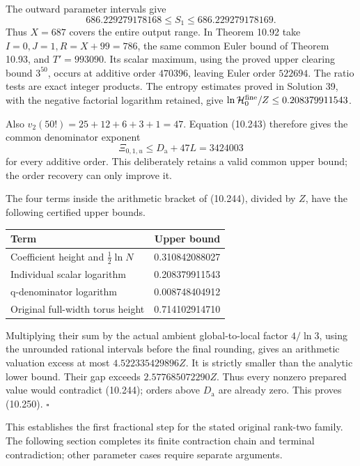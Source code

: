 \documentclass[
  11pt,
  a4paper,
]{article}
\newcounter{none} %
\begin{document}
The outward parameter intervals give \[
686.229279178168\le S_1\le686.229279178169.
\] Thus \(X=687\) covers the entire output range. In Theorem 10.92 take
\(I=0,J=1,R=X+99=786\), the same common Euler bound of Theorem 10.93,
and \(T'=993090\). Its scalar maximum, using the proved upper clearing
bound \(3^{50}\), occurs at additive order \(470396\), leaving Euler
order \(522694\). The ratio tests are exact integer products. The
entropy estimates proved in Solution 39, with the negative factorial
logarithm retained, give
\(\ln\mathcal H_0^{\rm fine}/Z\le0.208379911543\).

Also \(v_2(50!)=25+12+6+3+1=47\). Equation (10.243) therefore gives the
common denominator exponent \[
\Xi_{0,1,u}\le D_{\mathrm a}+47L=3424003
\] for every additive order. This deliberately retains a valid common
upper bound; the order recovery can only improve it.

The four terms inside the arithmetic bracket of (10.244), divided by
\(Z\), have the following certified upper bounds.

{\def\LTcaptype{none} %
\begin{longtable}[]{@{}lr@{}}
\toprule\noalign{}
Term & Upper bound \\
\midrule\noalign{}
\endhead
\bottomrule\noalign{}
\endlastfoot
Coefficient height and \(\tfrac12\ln N\) & 0.310842088027 \\
Individual scalar logarithm & 0.208379911543 \\
q-denominator logarithm & 0.008748404912 \\
Original full-width torus height & 0.714102914710 \\
\end{longtable}
}

Multiplying their sum by the actual ambient global-to-local factor
\(4/\ln3\), using the unrounded rational intervals before the final
rounding, gives an arithmetic valuation excess at most
\(4.522335429896Z\). It is strictly smaller than the analytic lower
bound. Their gap exceeds \(2.577685072290Z\). Thus every nonzero
prepared value would contradict (10.244); orders above \(D_{\mathrm a}\)
are already zero. This proves (10.250). \(\square\)

This establishes the first fractional step for the stated original
rank-two family. The following section completes its finite contraction
chain and terminal contradiction; other parameter cases require separate
arguments.
\end{document}
